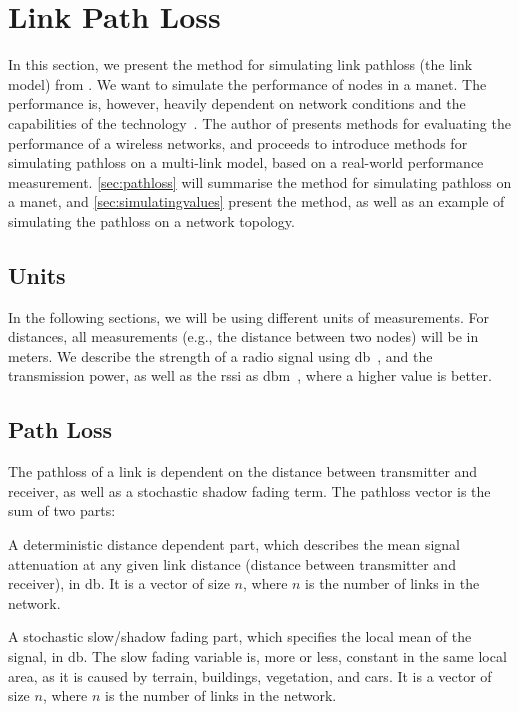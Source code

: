 \section{Link Path Loss}\label{sec:linkmodel}
In this section, we present the method for simulating link \gls{pathloss} (the link model) from \cite{paper:linkmodel}. We want to simulate the performance of nodes in a \gls{manet}. The performance is, however, heavily dependent on network conditions and the capabilities of the technology~\cite[p.~10]{paper:linkmodel}. The author of \cite{paper:linkmodel} presents methods for evaluating the performance of a wireless networks, and proceeds to introduce methods for simulating \gls{pathloss} on a multi-link model, based on a real-world performance measurement. \autoref{sec:pathloss} will summarise the method for simulating \gls{pathloss} on a \gls{manet}, and \autoref{sec:simulatingvalues} present the method, as well as an example of simulating the \gls{pathloss} on a network topology.%

\subsection{Units}
In the following sections, we will be using different units of measurements. For distances, all measurements (e.g., the distance between two nodes) will be in meters. We describe the strength of a radio signal using \acrshort{db}~\cite{website:isadbdbm}, and the transmission power, as well as the \gls{rssi} as \acrshort{dbm}~\cite{website:isadbdbm}, where a higher value is better.

\subsection{Path Loss}\label{sec:pathloss}
The \gls{pathloss} of a link is dependent on the distance between transmitter and receiver, as well as a stochastic shadow fading term. The \gls{pathloss} vector  is the sum of two parts:

\begin{description}[style=nextline]
    \item[$\vect{l_d}$] A deterministic distance dependent part, which describes the mean signal attenuation at any given link distance (distance between transmitter and receiver), in \gls{db}. It is a vector of size $n$, where $n$ is the number of links in the network.
    \item[$\vect{l_{fading}}$] A stochastic slow/shadow fading part, which specifies the local mean of the signal, in \gls{db}. The slow fading variable is, more or less, constant in the same local area, as it is caused by terrain, buildings, vegetation, and cars. It is a vector of size $n$, where $n$ is the number of links in the network.
\end{description}

